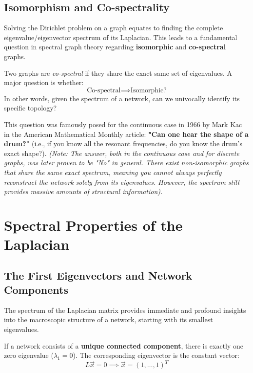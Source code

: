 \subsection{Isomorphism and Co-spectrality}
Solving the Dirichlet problem on a graph equates to finding the complete eigenvalue/eigenvector spectrum of its Laplacian. This leads to a fundamental question in spectral graph theory regarding \textbf{isomorphic} and \textbf{co-spectral} graphs.

Two graphs are \textit{co-spectral} if they share the exact same set of eigenvalues. A major question is whether:
\[
    \text{Co-spectral} \implies \text{Isomorphic?}
\]
In other words, given the spectrum of a network, can we univocally identify its specific topology?

This question was famously posed for the continuous case in 1966 by Mark Kac in the American Mathematical Monthly article: \textbf{"Can one hear the shape of a drum?"} (i.e., if you know all the resonant frequencies, do you know the drum's exact shape?).
\textit{(Note: The answer, both in the continuous case and for discrete graphs, was later proven to be "No" in general. There exist non-isomorphic graphs that share the same exact spectrum, meaning you cannot always perfectly reconstruct the network solely from its eigenvalues. However, the spectrum still provides massive amounts of structural information).}

\section{Spectral Properties of the Laplacian}

\subsection{The First Eigenvectors and Network Components}

The spectrum of the Laplacian matrix provides immediate and profound insights into the macroscopic structure of a network, starting with its smallest eigenvalues.

If a network consists of a \textbf{unique connected component}, there is exactly one zero eigenvalue (\( \lambda_1 = 0 \)). The corresponding eigenvector is the constant vector:
\[
    L \vec{x} = 0 \implies \vec{x} = (1, \dots, 1)^T
\]

